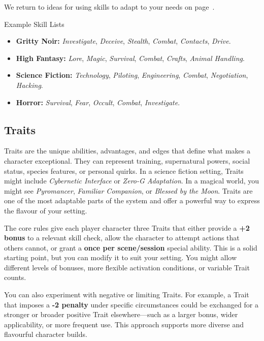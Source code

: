We return to ideas for using skills to adapt \wyrd to your needs on page~\pageref{toolbox:sec:adapting-skills}.

\begin{WyrdExampleSidebar}[float=!t]{Example Skill Lists}
    \begin{itemize}
        \item \textbf{Gritty Noir:} \textit{Investigate}, \textit{Deceive}, \textit{Stealth}, \textit{Combat}, \textit{Contacts}, \textit{Drive}.
        \item \textbf{High Fantasy:} \textit{Lore}, \textit{Magic}, \textit{Survival}, \textit{Combat}, \textit{Crafts}, \textit{Animal Handling}.
        \item \textbf{Science Fiction:} \textit{Technology}, \textit{Piloting}, \textit{Engineering}, \textit{Combat}, \textit{Negotiation}, \textit{Hacking}.
        \item \textbf{Horror:} \textit{Survival}, \textit{Fear}, \textit{Occult}, \textit{Combat}, \textit{Investigate}.
    \end{itemize}
\end{WyrdExampleSidebar}

\subsection{Traits}

Traits are the unique abilities, advantages, and edges that define what makes a character exceptional. They can represent training, supernatural powers, social status, species features, or personal quirks. In a science fiction setting, Traits might include \textit{Cybernetic Interface} or \textit{Zero-G Adaptation}. In a magical world, you might see \textit{Pyromancer}, \textit{Familiar Companion}, or \textit{Blessed by the Moon}. Traits are one of the most adaptable parts of the system and offer a powerful way to express the flavour of your setting.

The core rules give each player character three Traits that either provide a \textbf{+2 bonus} to a relevant skill check, allow the character to attempt actions that others cannot, or grant a \textbf{once per scene/session} special ability. This is a solid starting point, but you can modify it to suit your setting. You might allow different levels of bonuses, more flexible activation conditions, or variable Trait counts.

You can also experiment with negative or limiting Traits. For example, a Trait that imposes a \textbf{-2 penalty} under specific circumstances could be exchanged for a stronger or broader positive Trait elsewhere—such as a larger bonus, wider applicability, or more frequent use. This approach supports more diverse and flavourful character builds.

